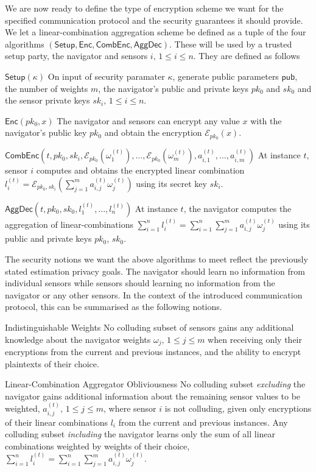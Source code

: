 \documentclass[10pt,letterpaper,oneside,twocolumn,journal]{IEEEtran}
\theoremstyle{definition}
\theoremstyle{definition}
\theoremstyle{remark}
\newcommand\shrtdots{\!...}
\begin{document}
We are now ready to define the type of encryption scheme we want for the specified communication protocol and the security guarantees it should provide. We let a linear-combination aggregation scheme be defined as a tuple of the four algorithms $(\mathsf{Setup}, \mathsf{Enc}, \mathsf{CombEnc}, \mathsf{AggDec})$. These will be used by a trusted setup party, the navigator and sensors $i,\,1\leq i \leq n$. They are defined as follows
\begin{LaTeXdescription}
    \item[$\mathsf{Setup}(\kappa)$] On input of security paramater $\kappa$, generate public parameters $\mathsf{pub}$, the number of weights $m$, the navigator's public and private keys $pk_0$ and $sk_0$ and the sensor private keys $sk_i,\,1\leq i \leq n$.
    \item[$\mathsf{Enc}(pk_0, x)$] The navigator and sensors can encrypt any value $x$ with the navigator's public key $pk_0$ and obtain the encryption $\mathcal{E}_{pk_0}(x)$.
    \item[$\mathsf{CombEnc}(t, pk_0, sk_i, \mathcal{E}_{pk_0}(\omega_1^{(t)}),\shrtdots,\mathcal{E}_{pk_0}(\omega_m^{(t)}), a^{(t)}_{i,1},\shrtdots,a^{(t)}_{i,m})$] At instance $t$, sensor $i$ computes and obtains the encrypted linear combination $l^{(t)}_i = \mathcal{E}_{pk_0,sk_i}(\sum^m_{j=1}a^{(t)}_{i,j}\omega^{(t)}_j)$ using its secret key $sk_i$.
    \item[$\mathsf{AggDec}(t, pk_0, sk_0, l^{(t)}_1,\shrtdots,l^{(t)}_n)$] At instance $t$, the navigator computes the aggregation of linear-combinations $\sum^{n}_{i=1}l_i^{(t)}=\sum^{n}_{i=1}\sum^{m}_{j=1} a^{(t)}_{i,j}\omega^{(t)}_j$ using its public and private keys $pk_0$, $sk_0$.
\end{LaTeXdescription}
The security notions we want the above algorithms to meet reflect the previously stated estimation privacy goals. The navigator should learn no information from individual sensors while sensors should learning no information from the navigator or any other sensors. In the context of the introduced communication protocol, this can be summarised as the following notions.
\begin{LaTeXdescription}
    \item[Indistinguishable Weights] No colluding subset of sensors gains any additional knowledge about the navigator weights $\omega_j,\,1\leq j \leq m$ when receiving only their encryptions from the current and previous instances, and the ability to encrypt plaintexts of their choice.
    \item[Linear-Combination Aggregator Obliviousness] No colluding subset \textit{excluding} the navigator gains additional information about the remaining sensor values to be weighted, $a^{(t)}_{i,j},\,1\leq j\leq m$, where sensor $i$ is not colluding, given only encryptions of their linear combinations $l_i$ from the current and previous instances. Any colluding subset \textit{including} the navigator learns only the sum of all linear combinations weighted by weights of their choice, $\sum^{n}_{i=1}l_i^{(t)}=\sum^{n}_{i=1}\sum^{m}_{j=1} a^{(t)}_{i,j}\omega^{(t)}_j$.
\end{LaTeXdescription}
\end{document}
